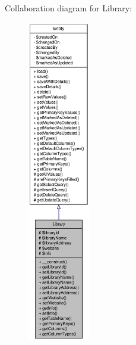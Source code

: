 Collaboration diagram for Library:\nopagebreak
\begin{figure}[H]
\begin{center}
\leavevmode
\includegraphics[height=400pt]{classLibrary__coll__graph}
\end{center}
\end{figure}
